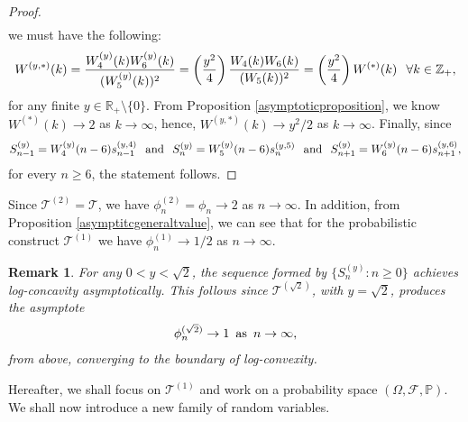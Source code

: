 \documentclass[a4paper,12pt]{article}
\newtheorem{rem}[thm]{Remark}
\def\R{\mathbb{R}}
\def\P{\mathbb{P}}
\def\Z{\mathbb{Z}}
\def\T{\mathcal{T}}
\def\F{\mathcal{F}}
\begin{document}
\begin{proof}
\begin{align}
\end{align}
we must have the following:
\begin{align}
W^{(y,*)}(k) = \frac{W^{(y)}_4(k)W^{(y)}_6(k)}{(W^{(y)}_5(k))^2} = \left(\frac{y^2}{4}\right)\frac{W_4(k)W_6(k)}{(W_5(k))^2} = \left( \frac{y^2}{4}\right)W^{(*)}(k) \hspace{0.1in} \forall k\in\Z_+,
\end{align}
for any finite $y\in\R_+\setminus\{0\}$. From Proposition \ref{asymptoticproposition}, we know $W^{(*)}(k) \rightarrow 2$ as $k\rightarrow \infty$, hence, $W^{(y,*)}(k) \rightarrow y^2/2$ as $k\rightarrow \infty$. Finally, since
\begin{align}
S^{(y)}_{n-1} = W^{(y)}_4(n-6)s^{(y,4)}_{n-1} \hspace{0.1in} \text{and} \hspace{0.1in} S^{(y)}_{n} = W^{(y)}_5(n-6)s^{(y,5)}_{n} \hspace{0.1in} \text{and} \hspace{0.1in} S^{(y)}_{n+1} = W^{(y)}_6(n-6)s^{(y,6)}_{n+1}, \notag
\end{align}
for every $n\geq 6$, the statement follows.
\end{proof}
Since $\T^{(2)} = \T$, we have $\phi^{(2)}_n = \phi_n \rightarrow 2$ as $n\rightarrow \infty$. In addition, from Proposition \ref{asymptitcgeneraltvalue}, we can see that for the probabilistic construct $\T^{(1)}$ we have $\phi^{(1)}_n \rightarrow 1/2$ as $n\rightarrow \infty$. 
\begin{rem}
For any $0 < y < \sqrt{2}$, the sequence formed by $\{S^{(y)}_n:n\geq 0\}$ achieves log-concavity asymptotically. This follows since $\T^{(\sqrt{2})}$, with $y=\sqrt{2}$, produces the asymptote 
\begin{align}
\phi^{(\sqrt{2})}_n \rightarrow 1 \,\,\, \text{as} \,\,\, n\rightarrow \infty, \notag
\end{align}
from above, converging to the boundary of log-convexity.
\end{rem}
Hereafter, we shall focus on $\T^{(1)}$ and work on a probability space $(\Omega,\F,\P)$. We shall now introduce a new family of random variables.
\end{document}
